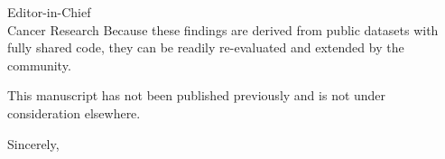 \documentclass[11pt]{letter}
\begin{document}
\begin{letter}{Editor-in-Chief \\ Cancer Research}
Because these findings are derived from public datasets with fully shared code, they can be readily re-evaluated and extended by the community.

This manuscript has not been published previously and is not under consideration elsewhere.

\closing{Sincerely,}

\end{letter}
\end{document}
